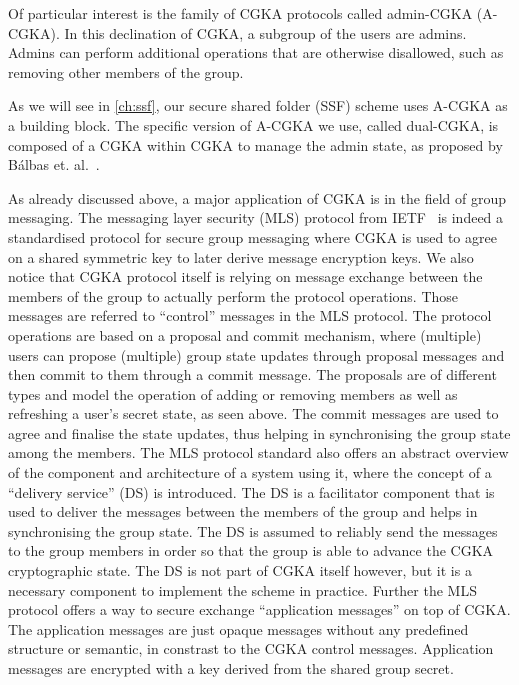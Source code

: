 Of particular interest is the family of CGKA protocols called admin-CGKA (A-CGKA).
In this declination of CGKA, a subgroup of the users are admins. 
Admins can perform additional operations that are otherwise disallowed, such as removing other members of the group.

As we will see in \cref{ch:ssf}, our secure shared folder (SSF) scheme uses A-CGKA as a building block.
The specific version of A-CGKA we use, called dual-CGKA, is composed of a CGKA within CGKA to manage the admin state, as proposed by
B{\'a}lbas et. al.~\cite{USENIX:BalColVau23}.

As already discussed above, a major application of CGKA is in the field of group messaging.
The messaging layer security (MLS) protocol from IETF~\cite{rfc9420} is
indeed a standardised protocol for secure group messaging
where CGKA is used to agree on a shared symmetric key to later derive message encryption keys.
We also notice that CGKA protocol itself is relying on message exchange
between the members of the group to actually perform the protocol operations.
Those messages are referred to ``control'' messages in the MLS protocol.
The protocol operations are based on a proposal and commit mechanism,
where (multiple) users can propose (multiple) group state updates
through proposal messages
and then commit to them through a commit message. The proposals
are of different types and model the operation of adding or removing 
members as well as refreshing a user's secret state, as seen above.
The commit messages are used to agree and finalise the state updates,
thus helping in synchronising the group state among the members.
The MLS protocol standard also offers an abstract overview of
the component and architecture of a system using it, 
where the concept of a ``delivery service''
(DS) is introduced. The DS is a facilitator component that is used to 
deliver the messages between the members of the group and helps in
synchronising the group state. The DS is assumed to reliably
send the messages to the group members in order so that the
group is able to advance the CGKA cryptographic state.
The DS is not part of CGKA itself however,
but it is a necessary component to implement the scheme in practice.
Further the MLS protocol offers a way to secure exchange ``application messages''
on top of CGKA. The application messages are just opaque messages
without any predefined structure or semantic, in constrast to the
CGKA control messages.
Application messages are encrypted with a key derived from the shared group secret.

